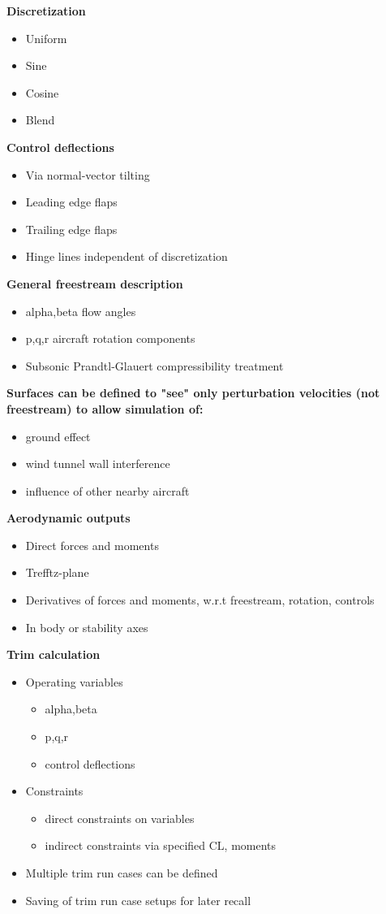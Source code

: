 %
\textbf{Discretization}
\begin{itemize}
	\item Uniform
	\item Sine
	\item Cosine
	\item Blend	
\end{itemize}
%
\textbf{Control deflections}
\begin{itemize}
	\item Via normal-vector tilting
	\item Leading edge flaps
	\item Trailing edge flaps
	\item Hinge lines independent of discretization
\end{itemize}
%
\textbf{General freestream description}
\begin{itemize}
	\item alpha,beta  flow angles
	\item p,q,r  aircraft rotation components
	\item Subsonic Prandtl-Glauert compressibility treatment
\end{itemize}
%
\textbf{Surfaces can be defined to "see" only perturbation velocities (not freestream) to allow simulation of: } 
\begin{itemize}	
	\item ground effect
	\item wind tunnel wall interference
	\item influence of other nearby aircraft
\end{itemize}
%
\textbf{Aerodynamic outputs} 
\begin{itemize}	
	\item Direct forces and moments
	\item Trefftz-plane
	\item Derivatives of forces and moments, w.r.t freestream, rotation, controls
	\item In body or stability axes
\end{itemize}
%
\textbf{Trim calculation} 
\begin{itemize}	
	\item Operating variables
	\begin{itemize}
		\item alpha,beta
		\item p,q,r
		\item control deflections
	\end{itemize}
	\item Constraints
	\begin{itemize}
		\item direct constraints on variables
		\item indirect constraints via specified CL, moments
	\end{itemize}
	\item Multiple trim run cases can be defined
	\item Saving of trim run case setups for later recall
\end{itemize}
